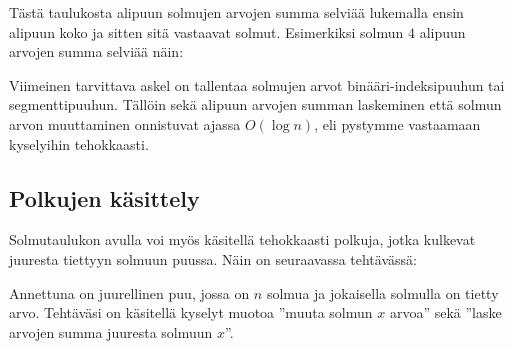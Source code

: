 Tästä taulukosta alipuun solmujen arvojen summa selviää
lukemalla ensin alipuun koko ja sitten sitä vastaavat solmut.
Esimerkiksi solmun $4$ alipuun arvojen summa selviää näin:

\begin{center}
\end{center}

Viimeinen tarvittava askel on tallentaa solmujen arvot
binääri-indeksi\-puuhun tai segmenttipuuhun.
Tällöin sekä alipuun arvojen summan laskeminen
että solmun arvon muuttaminen onnistuvat ajassa $O(\log n)$,
eli pystymme vastaamaan kyselyihin tehokkaasti.

\subsection{Polkujen käsittely}

Solmutaulukon avulla voi myös käsitellä tehokkaasti
polkuja, jotka kulkevat juuresta tiettyyn solmuun puussa.
Näin on seuraavassa tehtävässä:

\begin{task}
Annettuna on juurellinen puu, jossa on $n$ solmua
ja jokaisella solmulla on tietty arvo.
Tehtäväsi on käsitellä kyselyt muotoa
''muuta solmun $x$ arvoa'' sekä
''laske arvojen summa juuresta solmuun $x$''.
\end{task}

